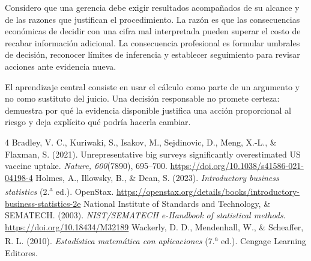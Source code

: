 \documentclass[
	spanish,
	letterpaper, oneside
]{article}
\begin{document}
Considero que una gerencia debe exigir resultados acompañados de su alcance y de las razones que justifican el procedimiento. La razón es que las consecuencias económicas de decidir con una cifra mal interpretada pueden superar el costo de recabar información adicional. La consecuencia profesional es formular umbrales de decisión, reconocer límites de inferencia y establecer seguimiento para revisar acciones ante evidencia nueva.

El aprendizaje central consiste en usar el cálculo como parte de un argumento y no como sustituto del juicio. Una decisión responsable no promete certeza: demuestra por qué la evidencia disponible justifica una acción proporcional al riesgo y deja explícito qué podría hacerla cambiar.
\clearpage
\renewcommand{\bibsection}{\section*{Referencias}\addcontentsline{toc}{section}{Referencias}}
\setlength{\bibhang}{1.27cm}\setlength{\bibsep}{10pt}
\begin{thebibliography}{4}
Bradley, V. C., Kuriwaki, S., Isakov, M., Sejdinovic, D., Meng, X.-L., \& Flaxman, S. (2021). Unrepresentative big surveys significantly overestimated US vaccine uptake. \textit{Nature, 600}(7890), 695--700. \url{https://doi.org/10.1038/s41586-021-04198-4}
Holmes, A., Illowsky, B., \& Dean, S. (2023). \textit{Introductory business statistics} (2.\textsuperscript{a} ed.). OpenStax. \url{https://openstax.org/details/books/introductory-business-statistics-2e}
National Institute of Standards and Technology, \& SEMATECH. (2003). \textit{NIST/SEMATECH e-Handbook of statistical methods}. \url{https://doi.org/10.18434/M32189}
Wackerly, D. D., Mendenhall, W., \& Scheaffer, R. L. (2010). \textit{Estadística matemática con aplicaciones} (7.\textsuperscript{a} ed.). Cengage Learning Editores.
\end{thebibliography}
\end{document}

